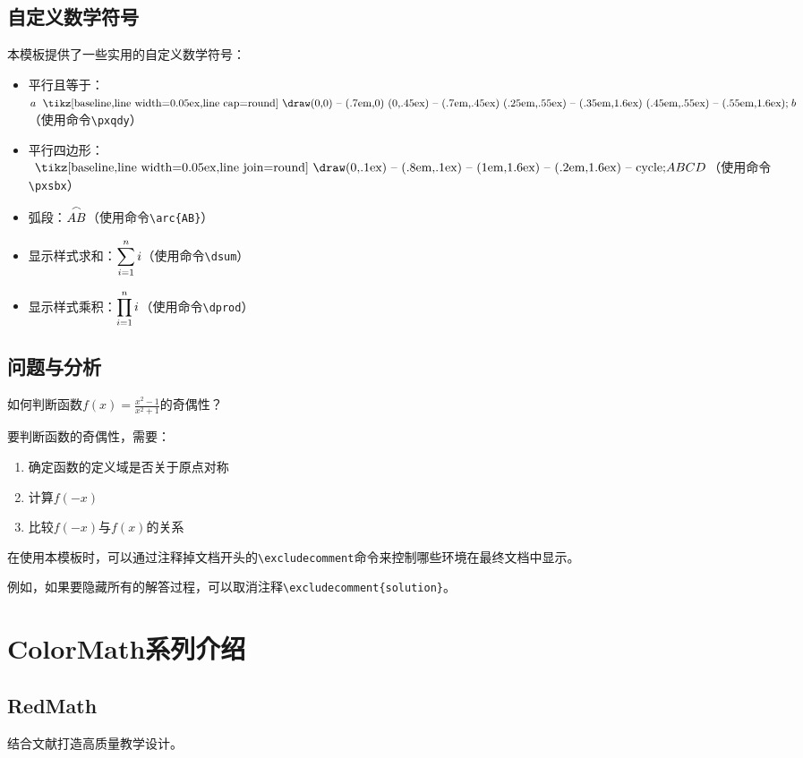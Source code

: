 \documentclass{ColorMath}
\begin{document}
\section{自定义数学符号}

本模板提供了一些实用的自定义数学符号：

\begin{itemize}
    \item 平行且等于：$a \pxqdy b$（使用命令\verb|\pxqdy|）
    \item 平行四边形：$\pxsbx ABCD$（使用命令\verb|\pxsbx|）
    \item 弧段：$\overset{\frown}{AB}$（使用命令\verb|\arc{AB}|）
    \item 显示样式求和：$\displaystyle\sum_{i=1}^n i$（使用命令\verb|\dsum|）
    \item 显示样式乘积：$\displaystyle\prod_{i=1}^n i$（使用命令\verb|\dprod|）
\end{itemize}


\section{问题与分析}

\begin{question}
    如何判断函数$f(x) = \frac{x^2 - 1}{x^2 + 1}$的奇偶性？
\end{question}

\begin{analysis}
    要判断函数的奇偶性，需要：
    \begin{enumerate}
        \item 确定函数的定义域是否关于原点对称
        \item 计算$f(-x)$
        \item 比较$f(-x)$与$f(x)$的关系
    \end{enumerate}
\end{analysis}

\begin{note}
    在使用本模板时，可以通过注释掉文档开头的\verb|\excludecomment|命令来控制哪些环境在最终文档中显示。

    例如，如果要隐藏所有的解答过程，可以取消注释\verb|\excludecomment{solution}|。
\end{note}

\chapter{ColorMath系列介绍}
\section{RedMath}
结合文献打造高质量教学设计。
\end{document}
